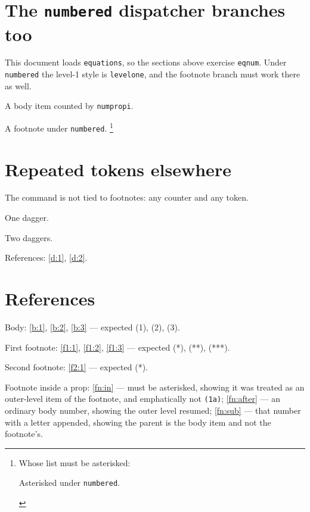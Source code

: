 \documentclass{article}
\begin{document}
\section{The \texttt{numbered} dispatcher branches too}

This document loads \texttt{equations}, so the sections above exercise
\texttt{eqnum}.  Under \texttt{numbered} the level-1 style is
\texttt{levelone}, and the footnote branch must work there as well.

\begingroup
{}
\begin{prop}
  \item A body item counted by \texttt{numpropi}. \label{n:1}
\end{prop}
A footnote under \texttt{numbered}.%
\footnote{Whose list must be asterisked:
  \begin{prop}
    \item Asterisked under \texttt{numbered}. \label{n:2}
  \end{prop}}
\endgroup

\section{Repeated tokens elsewhere}

The command is not tied to footnotes: any counter and any token.

\begin{prop}[counter = enumprop, counter format = \proprepeat{#1}{\dag},
             format = (#1)]
  \item One dagger. \label{d:1}
  \item Two daggers. \label{d:2}
\end{prop}

References: \ref{d:1}, \ref{d:2}.

\section{References}

Body: \ref{b:1}, \ref{b:2}, \ref{b:3} --- expected (1), (2), (3).

First footnote: \ref{f1:1}, \ref{f1:2}, \ref{f1:3} --- expected
(*), (**), (***).

Second footnote: \ref{f2:1} --- expected (*).

Footnote inside a prop: \ref{fn:in} --- must be asterisked, showing it was
treated as an outer-level item of the footnote, and emphatically not
\texttt{(1a)}; \ref{fn:after} --- an ordinary body number, showing the outer
level resumed; \ref{fn:sub} --- that number with a letter appended, showing
the parent is the body item and not the footnote's.
\end{document}

